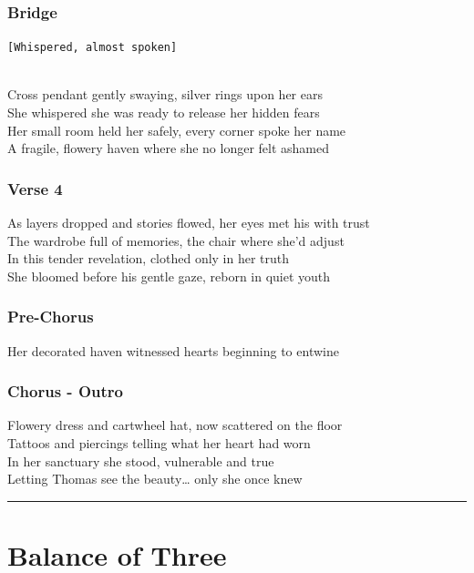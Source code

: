 \documentclass[]{article}
\begin{document}
\subsubsection{Bridge}\label{bridge-22}

\texttt{{[}Whispered,\ almost\ spoken{]}}\strut \\
Cross pendant gently swaying, silver rings upon her ears\\
She whispered she was ready to release her hidden fears\\
Her small room held her safely, every corner spoke her name\\
A fragile, flowery haven where she no longer felt ashamed

\subsubsection{Verse 4}\label{verse-4-12}

As layers dropped and stories flowed, her eyes met his with trust\\
The wardrobe full of memories, the chair where she'd adjust\\
In this tender revelation, clothed only in her truth\\
She bloomed before his gentle gaze, reborn in quiet youth

\subsubsection{Pre-Chorus}\label{pre-chorus-52}

Her decorated haven witnessed hearts beginning to entwine

\subsubsection{Chorus - Outro}\label{chorus---outro-4}

Flowery dress and cartwheel hat, now scattered on the floor\\
Tattoos and piercings telling what her heart had worn\\
In her sanctuary she stood, vulnerable and true\\
Letting Thomas see the beauty\ldots{} only she once knew

\begin{center}\rule{0.5\linewidth}{0.5pt}\end{center}

\section{Balance of Three}\label{balance-of-three}
\end{document}
